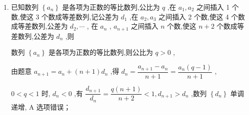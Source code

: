 \begin{enumerate}
\begin{jieda}
        所以 ${a}_{n} - {a}_{1} = 2 + {2}^{2} + \cdots  + {2}^{n - 1} = \dfrac{2\left( {1 - {2}^{n - 1}}\right) }{1 - 2} = {2}^{n} - 2$ ,
        
        解得: ${a}_{n} = {2}^{n} - 1$ ,当 $\mathrm{n} = 1$ 适合
        
        因为 $\dfrac{{a}_{n} + 1}{{a}_{n + 1} \cdot  \left( {{a}_{n + 1} - 1}\right) } = \dfrac{{2}^{n - 1}}{\left( {{2}^{n} - 1}\right) \left( {{2}^{n + 1} - 1}\right) } = \dfrac{1}{2}\left( {\dfrac{1}{{2}^{n} - 1} - \dfrac{1}{{2}^{n + 1} - 1}}\right)$ ,
        
        所以
        
        ${S}_{n} = \dfrac{1}{2}\left\lbrack  {\left( {\dfrac{1}{{2}^{1} - 1} - \dfrac{1}{{2}^{2} - 1}}\right)  + \left( {\dfrac{1}{{2}^{2} - 1} - \dfrac{1}{{2}^{3} - 1}}\right)  + \ldots \ldots  + \left( {\dfrac{1}{{2}^{n} - 1} - \dfrac{1}{{2}^{n + 1} - 1}}\right) }\right\rbrack   = \dfrac{1}{2}\left( {1 - \dfrac{1}{{2}^{n + 1} - 1}}\right) ,$
        
        又因为 ${S}_{n}$ 是单调递增数列,
        
        所以有 ${S}_{n} \in  \left\lbrack  {{S}_{1},\dfrac{1}{2}}\right)  = \left\lbrack  {\dfrac{1}{3},\dfrac{1}{2}}\right)$ ,对任意的正整数 $n$ ,都有 $k > {S}_{n}$ ,
        
        所以 $k \geq  \dfrac{1}{2}$ 
    \end{jieda}
    \item 已知数列 $\left\{  {a}_{n}\right\}$ 是各项为正数的等比数列,公比为 $q$ ,在 ${a}_{1},{a}_{2}$ 之间插入 1 个数,使这 3 个数成等差数列,记公差为 ${d}_{1}$ ,在 ${a}_{2},{a}_{3}$ 之间插入 2 个数,使这 4 个数成等差数列,公差为 ${d}_{2},\cdots$ , 在 ${a}_{n}$ , ${a}_{n + 1}$ 之间插入 $n$ 个数,使这 $n + 2$ 个数成等差数列,公差为 ${d}_{n}$ ,则 
    \begin{jieda}
        数列 $\left\{  {a}_{n}\right\}$ 是各项为正数的等比数列,则公比为 $q > 0$ ,
        
        由题意 ${a}_{n + 1} = {a}_{n} + \left( {n + 1}\right) {d}_{n}$ ,得 ${d}_{n} = \dfrac{{a}_{n + 1} - {a}_{n}}{n + 1} = \dfrac{{a}_{n}\left( {q - 1}\right) }{n + 1}$ ,
        
        $0 < q < 1$ 时, ${d}_{n} < 0$ ,有 $\dfrac{{d}_{n + 1}}{{d}_{n}} = \dfrac{q\left( {n + 1}\right) }{n + 2} < 1,{d}_{n + 1} > {d}_{n}$ ,数列 $\left\{  {d}_{n}\right\}$ 单调递增, $\mathrm{A}$ 选项错误；
        

\end{jieda}
\end{enumerate}
